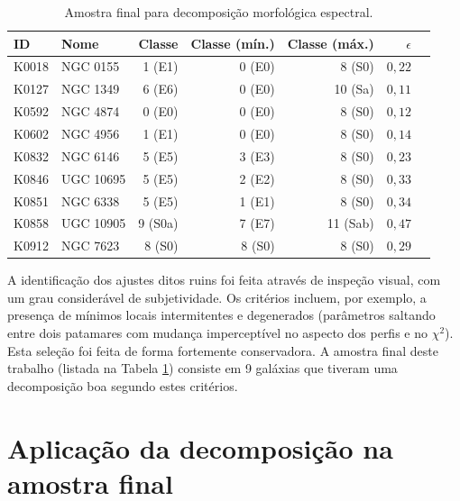 \begin{table}
\begin{tabular}{ l l r r r r l }
\hline
ID & Nome & Classe & Classe (mín.) & Classe (máx.) & $\epsilon$ \\
\hline
K0018 & NGC 0155  &  1 (E1)  & 0 (E0) &  8 (S0)  & $0,22$ \\
K0127 & NGC 1349  &  6 (E6)  & 0 (E0) & 10 (Sa)  & $0,11$ \\
K0592 & NGC 4874  &  0 (E0)  & 0 (E0) &  8 (S0)  & $0,12$ \\
K0602 & NGC 4956  &  1 (E1)  & 0 (E0) &  8 (S0)  & $0,14$ \\
K0832 & NGC 6146  &  5 (E5)  & 3 (E3) &  8 (S0)  & $0,23$ \\
K0846 & UGC 10695 &  5 (E5)  & 2 (E2) &  8 (S0)  & $0,33$ \\
K0851 & NGC 6338  &  5 (E5)  & 1 (E1) &  8 (S0)  & $0,34$ \\
K0858 & UGC 10905 &  9 (S0a) & 7 (E7) & 11 (Sab) & $0,47$ \\
K0912 & NGC 7623  &  8 (S0)  & 8 (S0) &  8 (S0)  & $0,29$ \\
\hline
\end{tabular}
\caption[Amostra final para decomposição morfológica espectral]
{Amostra final para decomposição morfológica espectral.}
\label{tab:DecompSampleFinal}
\end{table}

A identificação dos ajustes ditos ruins foi feita através de inspeção visual,
com um grau considerável de subjetividade. Os critérios incluem, por exemplo, a
presença de mínimos locais intermitentes e degenerados (parâmetros saltando
entre dois patamares com mudança imperceptível no aspecto dos perfis e no
$\chi^2$). Esta seleção foi feita de forma fortemente conservadora. A amostra
final deste trabalho (listada na Tabela \ref{tab:DecompSampleFinal}) consiste em
9 galáxias que tiveram uma decomposição boa segundo estes critérios.


\section{Aplicação da decomposição na amostra final}

